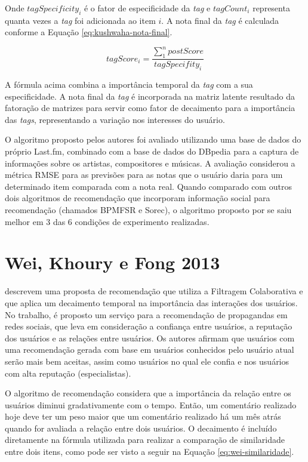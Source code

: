 Onde $tagSpecificity_i$ é o fator de especificidade da \textit{tag} e $tagCount_i$ representa quanta vezes a \textit{tag} foi adicionada
ao item $i$. A nota final da \textit{tag} é calculada conforme a Equação \ref{eq:kushwaha-nota-final}.

\begin{equation}
  \label{eq:kushwaha-nota-final}
  tagScore_i = \frac{\sum_1^n{postScore}}{tagSpecifity_i}
\end{equation}

A fórmula acima combina a importância temporal da \textit{tag} com a sua especificidade. A nota final da \textit{tag}
é incorporada na matriz latente resultado da fatoração de matrizes para servir como fator de decaimento para a importância
das \textit{tags}, representando a variação nos interesses do usuário.

O algoritmo proposto pelos autores foi avaliado utilizando uma base de dados do próprio Last.fm, combinado com a base de
dados do DBpedia para a captura de informações sobre os artistas, compositores e músicas. A avaliação considerou a
métrica RMSE para as previsões para as notas que o usuário daria para um determinado
item comparada com a nota real. Quando comparado com outros dois algoritmos de recomendação que incorporam
informação social para recomendação (chamados BPMFSR e Sorec), o algoritmo proposto por  se saiu melhor em 3
das 6 condições de experimento realizadas.

\section{Wei, Khoury e Fong 2013}

 descrevem uma proposta de recomendação que utiliza a Filtragem Colaborativa e que aplica um
decaimento temporal na importância das interações dos usuários. No trabalho, é proposto um serviço para a recomendação
de propagandas em redes sociais, que leva em consideração a confiança entre usuários, a reputação dos usuários e as
relações entre usuários. Os autores afirmam que usuários com uma recomendação gerada com base em usuários conhecidos
pelo usuário atual serão mais bem aceitas, assim como usuários no qual ele confia e nos usuários com alta reputação
(especialistas).

O algoritmo de recomendação considera que a importância da relação entre os usuários diminui gradativamente com o tempo.
Então, um comentário realizado hoje deve ter um peso maior que um comentário realizado há um mês atrás quando for
avaliada a relação entre dois usuários. O decaimento é incluído diretamente na fórmula utilizada para realizar a
comparação de similaridade entre dois itens, como pode ser visto a seguir na Equação \ref{eq:wei-similaridade}.

